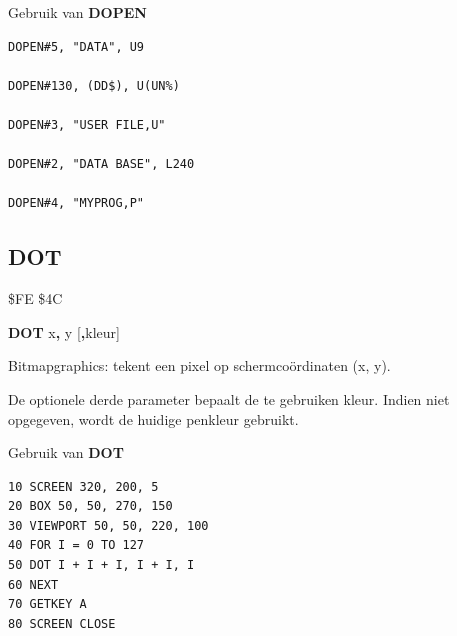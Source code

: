 \begin{description}[leftmargin=2cm,style=nextline]
\item [Voorbeelden:] Gebruik van {\bf DOPEN}

\begin{tcolorbox}[colback=black,coltext=white]
\verbatimfont{\codefont}
\begin{verbatim}
DOPEN#5, "DATA", U9

DOPEN#130, (DD$), U(UN%)

DOPEN#3, "USER FILE,U"

DOPEN#2, "DATA BASE", L240

DOPEN#4, "MYPROG,P"
\end{verbatim}
\end{tcolorbox}
\end{description}


\newpage
\subsection{DOT}
\begin{description}[leftmargin=2cm,style=nextline]
\item [Token:]    \$FE \$4C
\item [Formaat:]   {\bf DOT} x{\bf,} y [{\bf,}kleur]\item [Gebruik:]    Bitmapgraphics: tekent een pixel op schermcoördinaten (x, y).

                  De optionele derde parameter bepaalt de te gebruiken kleur. Indien niet opgegeven, wordt de huidige penkleur gebruikt.

\item [Voorbeeld:]  Gebruik van {\bf DOT}

\begin{tcolorbox}[colback=black,coltext=white]
\verbatimfont{\codefont}
\begin{verbatim}
10 SCREEN 320, 200, 5
20 BOX 50, 50, 270, 150
30 VIEWPORT 50, 50, 220, 100
40 FOR I = 0 TO 127
50 DOT I + I + I, I + I, I
60 NEXT
70 GETKEY A
80 SCREEN CLOSE
\end{verbatim}
\end{tcolorbox}

\end{description}


\newpage
